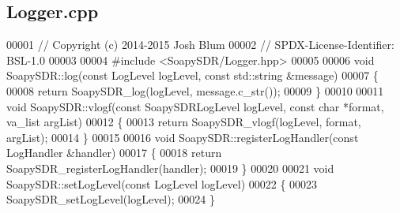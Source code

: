 \subsection{Logger.\+cpp}
\label{soapysdr_2lib_2Logger_8cpp_source}

\begin{DoxyCode}
00001 \textcolor{comment}{// Copyright (c) 2014-2015 Josh Blum}
00002 \textcolor{comment}{// SPDX-License-Identifier: BSL-1.0}
00003 
00004 \textcolor{preprocessor}{#include <SoapySDR/Logger.hpp>}
00005 
00006 \textcolor{keywordtype}{void} SoapySDR::log(\textcolor{keyword}{const} LogLevel logLevel, \textcolor{keyword}{const} std::string &message)
00007 \{
00008     \textcolor{keywordflow}{return} SoapySDR_log(logLevel, message.c\_str());
00009 \}
00010 
00011 \textcolor{keywordtype}{void} SoapySDR::vlogf(\textcolor{keyword}{const} SoapySDRLogLevel logLevel, \textcolor{keyword}{const} \textcolor{keywordtype}{char} *format, va\_list argList)
00012 \{
00013     \textcolor{keywordflow}{return} SoapySDR_vlogf(logLevel, format, argList);
00014 \}
00015 
00016 \textcolor{keywordtype}{void} SoapySDR::registerLogHandler(\textcolor{keyword}{const} LogHandler &handler)
00017 \{
00018     \textcolor{keywordflow}{return} SoapySDR_registerLogHandler(handler);
00019 \}
00020 
00021 \textcolor{keywordtype}{void} SoapySDR::setLogLevel(\textcolor{keyword}{const} LogLevel logLevel)
00022 \{
00023     SoapySDR_setLogLevel(logLevel);
00024 \}
\end{DoxyCode}
